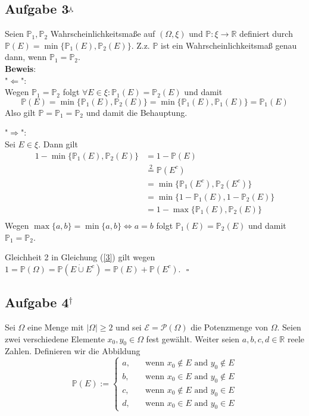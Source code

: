 \documentclass[11pt,a4paper,ngerman]{article}
\newcommand{\set}[1]{ \{ #1 \}}
\newcommand{\Prob}{\mathbb{P}}
\begin{document}
\subsection*{Aufgabe 3$^\curlywedgedownarrow$}
Seien $\Prob_1, \Prob_2$ Wahrscheinlichkeitsmaße auf $(\Omega, \xi)$ und $\Prob: \xi \to \mathbb{R}$ definiert durch $\Prob(E) = \min \set{\Prob_1(E), \Prob_2(E)}$. Z.z. $\Prob$ ist ein Wahrscheinlichkeitsmaß genau dann, wenn $\Prob_1 = \Prob_2$. \\

\textbf{Beweis}: \\
"$\Leftarrow$": \\
Wegen $\Prob_1 = \Prob_2$ folgt $\forall E \in \xi: \Prob_1(E) = \Prob_2(E)$ und damit
\begin{equation}
\Prob(E) = \min \set{\Prob_1(E), \Prob_2(E)} = \min \set{\Prob_1(E), \Prob_1(E)} = \Prob_1(E)
\end{equation}
Also gilt $\Prob = \Prob_1 = \Prob_2$ und damit die Behauptung.

"$\Rightarrow$": \\
Sei $E \in \xi$. Dann gilt
\begin{equation}\label{3}\begin{split}
1-\min \set{\Prob_1(E),\Prob_2(E)}
&= 1- \Prob(E) \\
&\stackrel{2}{=} \Prob(E^c)\\
&= \min \set{\Prob_1(E^c),\Prob_2(E^c)} \\
&= \min \set{1-\Prob_1(E),1-\Prob_2(E)} \\
&= 1- \max \set{\Prob_1(E),\Prob_2(E)} \\
\end{split}\end{equation}
Wegen $\max \set{a,b} = \min \set{a,b} \Leftrightarrow a = b$ folgt
$\Prob_1(E) = \Prob_2(E)$ und damit $\Prob_1 = \Prob_2$.

Gleichheit 2 in Gleichung (\ref{3}) gilt wegen $1 = \Prob(\Omega) = \Prob(E \dot{\cup} E^c) = \Prob(E) + \Prob(E^c)$.
$\mbox{}$ \hfill $\square$
\subsection*{Aufgabe 4$^\dagger$}
Sei $\Omega$ eine Menge mit $\left| \Omega \right| \geq 2$ und sei $\mathcal{E} = \mathcal{P}\left( \Omega \right)$ die Potenzmenge von $\Omega$. Seien
zwei verschiedene Elemente $x_0, y_0 \in \Omega$ fest gewählt. Weiter seien $a,b,c,d \in \mathbb{R}$ reele Zahlen. Definieren wir die Abbildung
$$
    \mathbb{P}(E) := \left\{ \begin{array}{lr} 
        a, &\quad \text{wenn } x_0 \not\in E \text{ and } y_0 \not\in E\\
        b, &\quad \text{wenn } x_0 \in E \text{ and } y_0 \not\in E\\
        c, &\quad \text{wenn } x_0 \not\in E \text{ and } y_0 \in E\\
        d, &\quad \text{wenn } x_0 \in E \text{ and } y_0 \in E
    \end{array}\right.
$$
\end{document}
